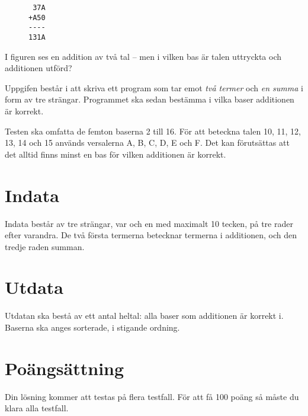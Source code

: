 
\begin{figure}
\centering
\begin{verbatim}
 37A
+A50
----
131A
\end{verbatim}
\end{figure}

I figuren ses en addition av två tal -- men i vilken bas är talen uttryckta och additionen utförd?

Uppgifen består i att skriva ett program som tar emot \emph{två termer} och \emph{en summa} i form av tre strängar. Programmet ska sedan bestämma i vilka baser additionen är korrekt.

Testen ska omfatta de femton baserna 2 till 16. För att beteckna talen 10, 11, 12, 13, 14 och 15 används versalerna A, B, C, D, E och F. Det kan förutsättas att det alltid finns minst en bas för vilken additionen är korrekt.

\section*{Indata}
Indata består av tre strängar, var och en med maximalt 10 tecken, på tre rader efter varandra. De två första termerna betecknar termerna i additionen, och den tredje raden summan.

\section*{Utdata}
Utdatan ska bestå av ett antal heltal: alla baser som additionen är korrekt i. Baserna ska anges sorterade, i stigande ordning.


\section*{Poängsättning}
Din lösning kommer att testas på flera testfall. För att få 100 poäng så måste du klara alla testfall.

